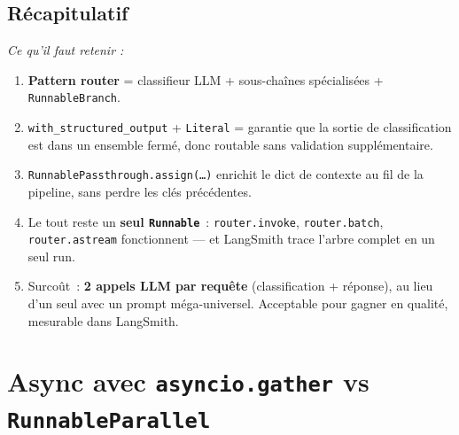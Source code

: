 \documentclass[11pt,a4paper]{article}
\begin{document}
\subsection*{Récapitulatif}
{\itshape\sloppy
\textit{Ce qu'il faut retenir :}
\begin{enumerate}[leftmargin=*]
  \item \textbf{Pattern router} = classifieur LLM + sous-chaînes
        spécialisées + \texttt{RunnableBranch}.
  \item \texttt{with\_structured\_output} + \texttt{Literal} = garantie
        que la sortie de classification est dans un ensemble fermé, donc
        routable sans validation supplémentaire.
  \item \texttt{RunnablePassthrough.assign(\dots)} enrichit le dict de
        contexte au fil de la pipeline, sans perdre les clés précédentes.
  \item Le tout reste un \textbf{seul \texttt{Runnable}}~:
        \texttt{router.invoke}, \texttt{router.batch},
        \texttt{router.astream} fonctionnent — et LangSmith trace l'arbre
        complet en un seul run.
  \item Surcoût~: \textbf{2 appels LLM par requête} (classification +
        réponse), au lieu d'un seul avec un prompt méga-universel.
        Acceptable pour gagner en qualité, mesurable dans LangSmith.
\end{enumerate}
\par}

\section{Async avec \texttt{asyncio.gather} vs \texttt{RunnableParallel}}
\end{document}
